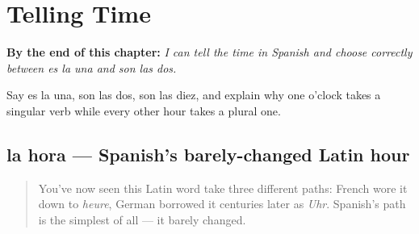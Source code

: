 
\chapter{Telling Time}
\label{ch:spanish-telling-time}

\begin{chapteropening}
\textbf{By the end of this chapter:} \emph{I can tell the time in Spanish and choose correctly between es la una and son las dos.}

Say es la una, son las dos, son las diez, and explain why one o'clock takes a singular verb while every other hour takes a plural one.
\end{chapteropening}

\section[la hora]{la hora — Spanish's barely-changed Latin hour}

\label{lesson:ES-C29-la-hora}



\begin{quote}
You've now seen this Latin word take three different paths: French wore it down to \emph{heure}, German borrowed it centuries later as \emph{Uhr}. Spanish's path is the simplest of all — it barely changed.
\end{quote}

